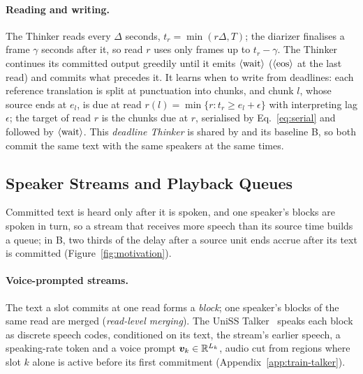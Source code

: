 \paragraph{Reading and writing.} The Thinker reads every $\Delta$ seconds, $t_r=\min(r\Delta,T)$; the diarizer
finalises a frame $\gamma$ seconds after it, so read $r$ uses only frames up to $t_r-\gamma$. The Thinker continues its
committed output greedily until it emits $\langle\mathrm{wait}\rangle$ ($\langle\mathrm{eos}\rangle$ at the last read) and commits what precedes it. It learns when
to write from deadlines: each reference translation is split at punctuation into chunks, and chunk $l$, whose source
ends at $e_l$, is due at read $r(l)=\min\{r:t_r\ge e_l+\epsilon\}$ with interpreting lag $\epsilon$; the target of read
$r$ is the chunks due at $r$, serialised by Eq.~\eqref{eq:serial} and followed by $\langle\mathrm{wait}\rangle$. This \emph{deadline Thinker}
is shared by \sys{} and its baseline B, so both commit the same text with the same speakers at the same times.

\subsection{Speaker Streams and Playback Queues}
\label{sec:method-queue}

Committed text is heard only after it is spoken, and one speaker's blocks are spoken in turn, so a stream that receives
more speech than its source time builds a queue; in B, two thirds of the delay after a source unit ends accrue after
its text is committed (Figure~\ref{fig:motivation}).

\paragraph{Voice-prompted streams.} The text a slot commits at one read forms a \emph{block}; one speaker's blocks of
the same read are merged (\emph{read-level merging}). The UniSS Talker~\citep{uniss2025} speaks each block as discrete
speech codes, conditioned on its text, the stream's earlier speech, a speaking-rate token and a voice prompt
$\bm{v}_k\in\mathbb{R}^{L_k}$, audio cut from regions where slot $k$ alone is active before its first commitment
(Appendix~\ref{app:train-talker}).

